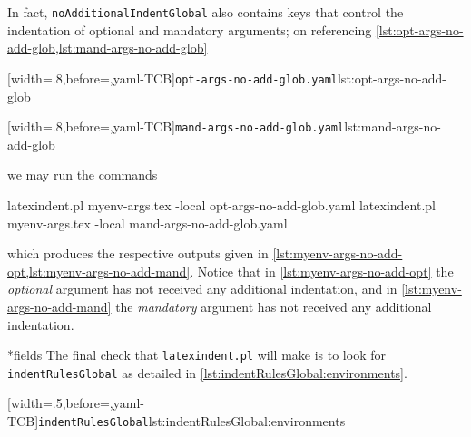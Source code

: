  In fact, \texttt{noAdditionalIndentGlobal} also contains keys that control the
 indentation of optional and mandatory arguments; on referencing
 \cref{lst:opt-args-no-add-glob,lst:mand-args-no-add-glob}

 \begin{minipage}{.49\textwidth}
  [width=.8\linewidth,before=\centering,yaml-TCB]{\texttt{opt-args-no-add-glob.yaml}}{lst:opt-args-no-add-glob}
 \end{minipage}
 \hfill
 \begin{minipage}{.49\textwidth}
  [width=.8\linewidth,before=\centering,yaml-TCB]{\texttt{mand-args-no-add-glob.yaml}}{lst:mand-args-no-add-glob}
 \end{minipage}

 we may run the commands 
 \begin{commandshell}
latexindent.pl myenv-args.tex -local opt-args-no-add-glob.yaml
latexindent.pl myenv-args.tex -local mand-args-no-add-glob.yaml
\end{commandshell}
 which produces the respective outputs given in
 \cref{lst:myenv-args-no-add-opt,lst:myenv-args-no-add-mand}. Notice that in
 \cref{lst:myenv-args-no-add-opt} the \emph{optional} argument has not received any
 additional indentation, and in \cref{lst:myenv-args-no-add-mand} the \emph{mandatory}
 argument has not received any additional indentation.

 \begin{minipage}{.45\textwidth}
 \end{minipage}
 \hfill
 \begin{minipage}{.45\textwidth}
 \end{minipage}

*{fields}
 The final check that \texttt{latexindent.pl} will make is to look for
 \texttt{indentRulesGlobal} as detailed in \cref{lst:indentRulesGlobal:environments}.

 [width=.5\linewidth,before=\centering,yaml-TCB]{\texttt{indentRulesGlobal}}{lst:indentRulesGlobal:environments}

